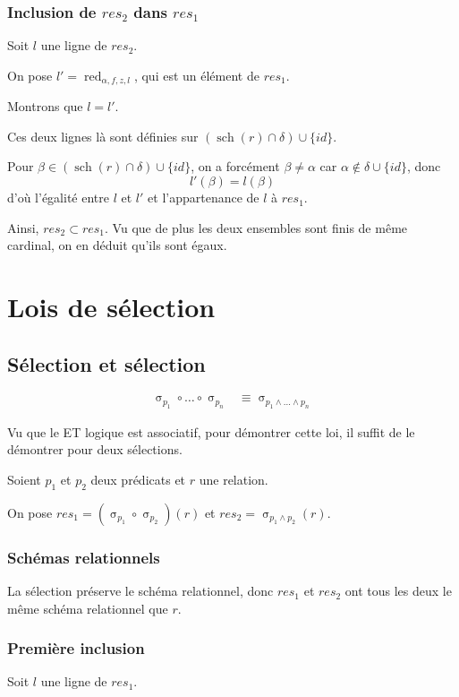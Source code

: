 \documentclass[french]{article}
\DeclareMathOperator{\sel}{\sigma}
\DeclareMathOperator{\s}{sch}
\DeclareMathOperator{\redu}{red}
\newcommand{\cip}{\cup \{id\}}
\newcommand{\dilta}{{\delta \cip}}
\begin{document}
\subsubsection*{Inclusion de $res_2$ dans $res_1$}
Soit $l$ une ligne de $res_2$.

On pose $l' = \redu_{\alpha, f, z, l}$,
qui est un élément de $res_1$.

Montrons que $l = l'$.

Ces deux lignes là sont définies sur
$(\s(r) \cap \delta) \cip$.

Pour $\beta \in (\s(r) \cap \delta) \cip$,
on a forcément $\beta \neq \alpha$ car
$\alpha \notin \dilta$, donc
$$
l'(\beta) = l(\beta)
$$
d'où l'égalité entre $l$ et $l'$ et l'appartenance de $l$ à $res_1$.

Ainsi, $res_2 \subset res_1$. Vu que de plus les deux ensembles sont finis de même cardinal,
on en déduit qu'ils sont égaux.

\section*{Lois de sélection}
\subsection*{Sélection et sélection}
\begin{align}
\sel_{p_1} \circ \dots \circ \sel_{p_n}
&\equiv \sel_{p_1 \wedge \dots \wedge p_n} 
\end{align}

Vu que le ET logique est associatif, pour démontrer cette loi,
il suffit de le démontrer pour deux sélections.

Soient $p_1$ et $p_2$ deux prédicats et 
$r$ une relation.

On pose $res_1 = (\sel_{p_1} \circ \sel_{p_2}) (r)$
et $res_2 = \sel_{p_1 \wedge p_2}(r)$.

\subsubsection*{Schémas relationnels}
La sélection préserve le schéma relationnel,
donc $res_1$ et $res_2$ ont tous les deux le même
schéma relationnel que $r$.

\subsubsection*{Première inclusion}
Soit $l$ une ligne de 
$res_1$.
\end{document}
